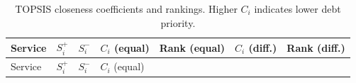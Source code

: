 \documentclass[
  12pt,
  letterpaper,
  12pt,
  oneside,
  english,
  onehalfspacing,
  headsepline]{MastersDoctoralThesis}
\begin{document}
\begin{longtable}[]{@{}
  >{\raggedright\arraybackslash}p{}
  >{\raggedright\arraybackslash}p{}
  >{\raggedright\arraybackslash}p{}
  >{\raggedright\arraybackslash}p{}
  >{\raggedright\arraybackslash}p{}
  >{\raggedright\arraybackslash}p{}
  >{\raggedright\arraybackslash}p{}@{}}
\caption{TOPSIS closeness coefficients and rankings. Higher \(C_i\)
indicates lower debt priority.}\label{tbl-topsis-results}\tabularnewline
\toprule\noalign{}
\begin{minipage}[b]{\linewidth}\raggedright
Service
\end{minipage} & \begin{minipage}[b]{\linewidth}\raggedright
\(S_i^+\)
\end{minipage} & \begin{minipage}[b]{\linewidth}\raggedright
\(S_i^-\)
\end{minipage} & \begin{minipage}[b]{\linewidth}\raggedright
\(C_i\) (equal)
\end{minipage} & \begin{minipage}[b]{\linewidth}\raggedright
Rank (equal)
\end{minipage} & \begin{minipage}[b]{\linewidth}\raggedright
\(C_i\) (diff.)
\end{minipage} & \begin{minipage}[b]{\linewidth}\raggedright
Rank (diff.)
\end{minipage} \\
\midrule\noalign{}
\endfirsthead
\toprule\noalign{}
\begin{minipage}[b]{\linewidth}\raggedright
Service
\end{minipage} & \begin{minipage}[b]{\linewidth}\raggedright
\(S_i^+\)
\end{minipage} & \begin{minipage}[b]{\linewidth}\raggedright
\(S_i^-\)
\end{minipage} & \begin{minipage}[b]{\linewidth}\raggedright
\(C_i\) (equal)
\end{minipage} & \begin{minipage}[b]{\linewidth}\raggedright

\end{minipage}
\end{longtable}
\end{document}
